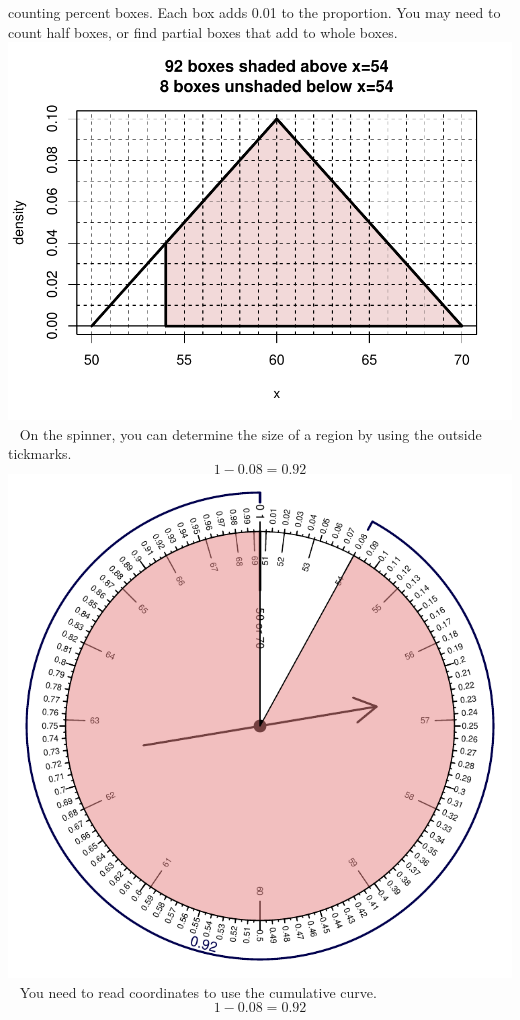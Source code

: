 \begin{solution}
\begin{answerlist}
counting percent boxes. Each box adds 0.01 to the proportion. You may
need to count half boxes, or find partial boxes that add to whole boxes.
\includegraphics{unnamed-chunk-8-1.pdf} ~ On the spinner, you can
determine the size of a region by using the outside tickmarks.
\[1-0.08=0.92\] \includegraphics{unnamed-chunk-9-1.pdf} ~ You need to
read coordinates to use the cumulative curve. \[1-0.08=0.92\]

\end{answerlist}
\end{solution}
